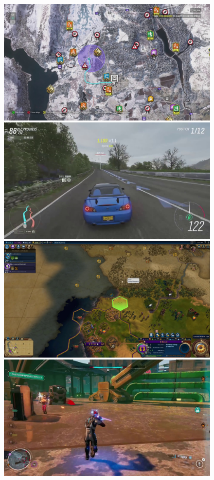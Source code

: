 \begin{figure}[h]
    \centering
    \includegraphics[scale=0.11]{images/discoloration_146.jpg}
    \includegraphics[scale=0.11]{images/dotted_line_345.jpg}
    \includegraphics[scale=0.11]{images/shader_1.jpg}
    \includegraphics[scale=0.11]{images/screen_tearing_132.jpg}

\end{figure}
